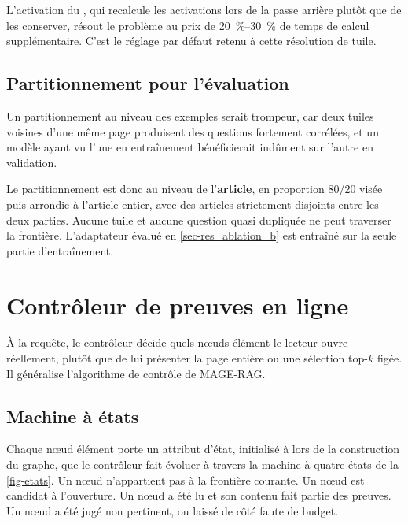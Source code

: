 L'activation du , qui recalcule les activations
lors de la passe arrière plutôt que de les conserver, résout le problème au prix
de \SIrange{20}{30}{\percent} de temps de calcul supplémentaire. C'est le réglage
par défaut retenu à cette résolution de tuile.
 
\subsection{Partitionnement pour l'évaluation}
\label{sec-contrastif_split}
 
Un partitionnement au niveau des exemples serait trompeur, car deux tuiles
voisines d'une même page produisent des questions fortement corrélées, et un
modèle ayant vu l'une en entraînement bénéficierait indûment sur l'autre en
validation.
 
Le partitionnement est donc au niveau de l'\textbf{article}, en proportion
\num{80}/\num{20} visée puis arrondie à l'article entier, avec des articles
strictement disjoints entre les deux parties. Aucune tuile et aucune question quasi dupliquée ne peut traverser la
frontière. L'adaptateur évalué en \cref{sec-res_ablation_b} est entraîné sur la
seule partie d'entraînement.

\section{Contrôleur de preuves en ligne}
\label{sec-controleur}
 
À la requête, le contrôleur décide quels nœuds élément le lecteur ouvre
réellement, plutôt que de lui présenter la page entière ou une sélection
top-$k$ figée. Il généralise l'algorithme de contrôle de MAGE-RAG.
 
\subsection{Machine à états}
\label{sec-controleur_etats}
 
Chaque nœud élément porte un attribut d'état, initialisé à  lors
de la construction du graphe, que le contrôleur fait évoluer à travers la machine
à quatre états de la \cref{fig-etats}. Un nœud  n'appartient pas
à la frontière courante. Un nœud  est candidat à l'ouverture. Un
nœud  a été lu et son contenu fait partie des preuves. Un nœud
 a été jugé non pertinent, ou laissé de côté faute de budget.
 
